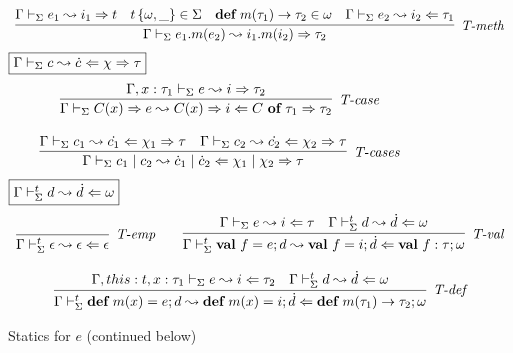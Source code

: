 \begin{figure}
\[\begin{array}{c}
\infer[\textit{T-meth}]
	{\Gamma \vdash_\Sigma  e_1.m(e_2) \leadsto i_1.m(i_2) \Rightarrow \tau_2} 
	{\Gamma \vdash_\Sigma e_1 \leadsto i_1 \Rightarrow t & t\,\{\omega, \_\} \in \Sigma & \keyw{def}\ m(\tau_1) \rightarrow \tau_2 \in \omega & \Gamma \vdash_\Sigma e_2 \leadsto i_2 \Leftarrow \tau_1}
\end{array}
\]
$\fbox{$\Gamma \vdash_\Sigma c \leadsto \dot{c} \Leftarrow \chi \Rightarrow \tau$}$
\[
\begin{array}{c}
\infer[\textit{T-case}]
	{\Gamma \vdash_\Sigma  C(x)\Rightarrow e  \leadsto C(x)\Rightarrow i \Leftarrow C\ \keyw{of}\ \tau_1 \Rightarrow \tau_2} 
	{\Gamma, x:\tau_1 \vdash_\Sigma e \leadsto i \Rightarrow \tau_2}\\[3ex]

\infer[\textit{T-cases}]
	{\Gamma \vdash_\Sigma c_1 \bnfalt c_2 \leadsto \dot{c}_1 \bnfalt \dot{c}_2 \Leftarrow \chi_1 \bnfalt \chi_2 \Rightarrow \tau  } 
	{\Gamma \vdash_\Sigma c_1 \leadsto \dot{c_1} \Leftarrow \chi_1 \Rightarrow \tau & \Gamma \vdash_\Sigma c_2 \leadsto \dot{c_2} \Leftarrow \chi_2 \Rightarrow \tau}
\end{array}
\]
$\fbox{$\Gamma \vdash_\Sigma^t d \leadsto \dot d \Leftarrow \omega$}$
\[
\begin{array}{c}
\infer[\textit{T-emp}]
	{\Gamma \vdash_\Sigma^t \epsilon  \leadsto \epsilon \Leftarrow \epsilon}
	{ }
~~~~~~
\infer[\textit{T-val}]
	{\Gamma \vdash_\Sigma^t \keyw{val}~ f = e; d \leadsto \keyw{val}~ f = i; \dot{d}\Leftarrow \keyw{val}~ f : \tau; \omega }
	{\Gamma \vdash_\Sigma e \leadsto i \Leftarrow \tau & \Gamma \vdash_\Sigma^t d \leadsto \dot{d} \Leftarrow \omega} \\[3ex]
	
\infer[\textit{T-def}]
	{\Gamma \vdash_\Sigma^t \keyw{def}~ m(x) = e; d  \leadsto \keyw{def}~ m(x) = i; \dot{d} \Leftarrow \keyw{def}~ m(\tau_1)\rightarrow\tau_2; \omega}
	{\Gamma, this : t, x : \tau_1 \vdash_\Sigma e\leadsto i  \Leftarrow \tau_2  & \Gamma \vdash_\Sigma^t d  \leadsto \dot{d} \Leftarrow \omega}
\end{array}
\]
\label{fig:statics1}
\vspace{-10px}
\caption{Statics for $e$ (continued below)}
\end{figure}

